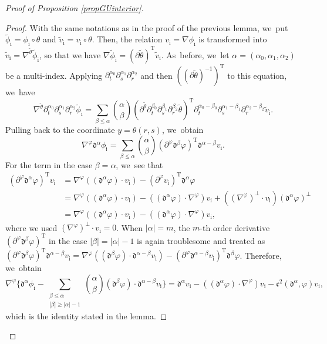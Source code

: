 \documentclass[11pt]{article}
\newcommand{\dt}{\partial_t}
\theoremstyle{definition}
\begin{document}
\begin{proof}[Proof of Proposition \ref{propGUinterior}]
\begin{proof}
With the same notations as in the proof of the previous lemma, we~put $\tilde{\phi}_\mathrm{i}=\phi_\mathrm{i}\circ\theta$ and $\tilde{v}_\mathrm{i}=v_\mathrm{i}\circ\theta$.
Then, the relation $v_\mathrm{i}=\nabla\phi_\mathrm{i}$ is transformed into $\tilde{v}_\mathrm{i}=\nabla^{\tilde{\theta}}\tilde{\phi}_\mathrm{i}$,
so that we have $\nabla\tilde{\phi}_\mathrm{i}=(\partial\tilde{\theta})^\mathrm{T}\tilde{v}_\mathrm{i}$. As~before, we~let $\alpha=(\alpha_0,\alpha_1,\alpha_2)$ be a multi-index.
Applying $\dt^{\alpha_0}\partial_s^{\alpha_1}\partial_r^{\alpha_2}$ and then $((\partial\tilde{\theta})^{-1})^\mathrm{T}$ to this equation, we~have
\[
\nabla^{\tilde{\theta}}\dt^{\alpha_0}\partial_s^{\alpha_1}\partial_r^{\alpha_2}\tilde{\phi}_\mathrm{i}
= \sum_{\beta\leq\alpha} \binom{\alpha}{\beta} (\partial^{\tilde{\theta}}\dt^{\beta_0}\partial_s^{\beta_1}\partial_r^{\beta_2}\tilde{\theta})^\mathrm{T}
\dt^{\alpha_0-\beta_0}\partial_s^{\alpha_1-\beta_1}\partial_r^{\alpha_2-\beta_2}\tilde{v}_\mathrm{i}.
\]
Pulling back to the coordinate $y=\theta(r,s)$, we~obtain
\[
\nabla^\varphi\mathfrak{d}^{\alpha}\phi_\mathrm{i}
= \sum_{\beta\leq\alpha} \binom{\alpha}{\beta} (\partial^\varphi\mathfrak{d}^{\beta}\varphi)^\mathrm{T}\mathfrak{d}^{\alpha-\beta}v_\mathrm{i}.
\]
For the term in the case $\beta=\alpha$, we~see that
\begin{align*}
(\partial^\varphi\mathfrak{d}^{\alpha}\varphi)^\mathrm{T}v_\mathrm{i}
&= \nabla^\varphi((\mathfrak{d}^{\alpha}\varphi)\cdot v_\mathrm{i}) - (\partial^\varphi v_\mathrm{i})^\mathrm{T}\mathfrak{d}^{\alpha}\varphi \\
&= \nabla^\varphi((\mathfrak{d}^{\alpha}\varphi)\cdot v_\mathrm{i}) - ((\mathfrak{d}^{\alpha}\varphi)\cdot\nabla^\varphi)v_\mathrm{i}
+ ((\nabla^\varphi)^\perp\cdot v_\mathrm{i})(\mathfrak{d}^{\alpha}\varphi)^\perp \\
&= \nabla^\varphi((\mathfrak{d}^{\alpha}\varphi)\cdot v_\mathrm{i}) - ((\mathfrak{d}^{\alpha}\varphi)\cdot\nabla^\varphi)v_\mathrm{i},
\end{align*}
where we used $(\nabla^\varphi)^\perp\cdot v_\mathrm{i}=0$.
When $|\alpha|=m$, the $m$-th order derivative $(\partial^\varphi\mathfrak{d}^{\beta}\varphi)^\mathrm{T}$ in the case $|\beta|=|\alpha|-1$
is again troublesome and treated as $(\partial^\varphi\mathfrak{d}^{\beta}\varphi)^\mathrm{T}\mathfrak{d}^{\alpha-\beta}v_\mathrm{i}
= \nabla^\varphi((\mathfrak{d}^{\beta}\varphi)\cdot\mathfrak{d}^{\alpha-\beta}v_\mathrm{i})
- (\partial^\varphi\mathfrak{d}^{\alpha-\beta}v_\mathrm{i})^\mathrm{T}\mathfrak{d}^{\beta}\varphi$.
Therefore, we~obtain
\[
\nabla^\varphi\biggl\{ \mathfrak{d}^{\alpha}\phi_\mathrm{i}
- \sum_{\substack{\beta\leq\alpha\\ |\beta|\geq|\alpha|-1}} \binom{\alpha}{\beta} (\mathfrak{d}^{\beta}\varphi)\cdot\mathfrak{d}^{\alpha-\beta}v_\mathrm{i} \biggr\}
= \mathfrak{d}^{\alpha}v_\mathrm{i} - ((\mathfrak{d}^{\alpha}\varphi)\cdot\nabla^\varphi)v_\mathrm{i} -\mathfrak{c}^2({\mathfrak d}^\alpha,\varphi)v_\mathrm{i},
\]
which is the identity stated in the lemma.
\end{proof}


\end{proof}
\end{document}
